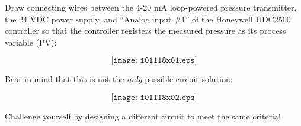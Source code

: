 

Draw connecting wires between the 4-20 mA loop-powered pressure transmitter, the 24 VDC power supply, and ``Analog input \#1'' of the Honeywell UDC2500 controller so that the controller registers the measured pressure as its process variable (PV):

$$\texttt{[image: i01118x01.eps]}$$







Bear in mind that this is not the {\it only} possible circuit solution:

$$\texttt{[image: i01118x02.eps]}$$

Challenge yourself by designing a different circuit to meet the same criteria! 











